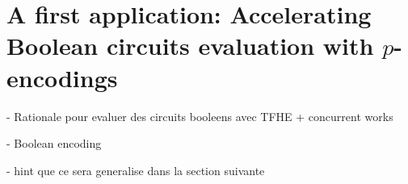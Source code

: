\chapter{A first application: Accelerating Boolean circuits evaluation with $p$-encodings}


- Rationale pour evaluer des circuits booleens avec TFHE + concurrent works

- Boolean encoding

- hint que ce sera generalise dans la section suivante

